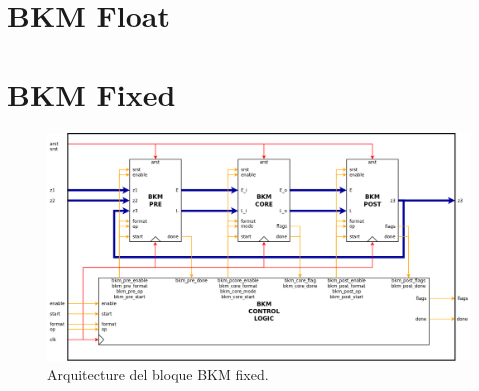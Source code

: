 \documentclass[10pt,a4paper]{book}
\begin{document}
   \section{BKM Float}

   \section{BKM Fixed}

      \begin{figure}[h]
         \centering
         \includegraphics[width=1.0\textwidth]{./figures/bkm_fixed.png}
         \caption{Arquitecture del bloque BKM fixed.}
         \label{fig:bkm_fixed}
      \end{figure}
\end{document}
